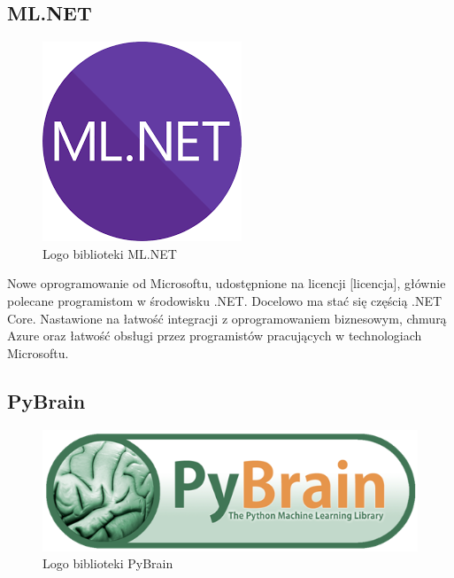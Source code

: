\documentclass[12pt,a4paper,twoside,titlepage,openright]{book}
\begin{document}
\subsection{ML.NET}
\begin{figure}[h]
	\centering
			\includegraphics[resolution=120]{ML_NET.png}
		\caption{Logo biblioteki ML.NET}
\end{figure}
Nowe oprogramowanie od Microsoftu, udostępnione na licencji [licencja], głównie polecane programistom w środowisku .NET. Docelowo ma stać się częścią .NET Core. Nastawione na łatwość integracji z oprogramowaniem biznesowym, chmurą Azure oraz łatwość obsługi przez programistów pracujących w technologiach Microsoftu.

\subsection{PyBrain}
\begin{figure}[h]
	\centering
			\includegraphics[resolution=120]{PyBrain.png}
		\caption{Logo biblioteki PyBrain}
\end{figure}
\end{document}

